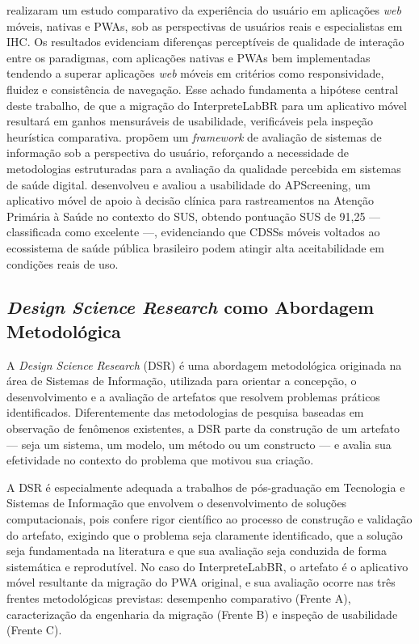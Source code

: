 \documentclass[12pt]{article}
\begin{document}
\cite{cardieri2018} realizaram um estudo comparativo da experiência do
usuário em aplicações \textit{web} móveis, nativas e PWAs, sob as
perspectivas de usuários reais e especialistas em IHC. Os resultados
evidenciam diferenças perceptíveis de qualidade de interação entre os
paradigmas, com aplicações nativas e PWAs bem implementadas tendendo a
superar aplicações \textit{web} móveis em critérios como responsividade,
fluidez e consistência de navegação. Esse achado fundamenta a hipótese
central deste trabalho, de que a migração do InterpreteLabBR para um
aplicativo móvel resultará em ganhos mensuráveis de usabilidade,
verificáveis pela inspeção heurística comparativa. \cite{rampinelli2026}
propõem um \textit{framework} de avaliação de sistemas de informação sob a
perspectiva do usuário, reforçando a necessidade de metodologias estruturadas
para a avaliação da qualidade percebida em sistemas de saúde digital.
\cite{vaz2026} desenvolveu e avaliou a usabilidade do APScreening, um
aplicativo móvel de apoio à decisão clínica para rastreamentos na Atenção
Primária à Saúde no contexto do SUS, obtendo pontuação SUS de 91,25 ---
classificada como excelente ---, evidenciando que CDSSs móveis voltados ao
ecossistema de saúde pública brasileiro podem atingir alta aceitabilidade em
condições reais de uso.

\subsection{\textit{Design Science Research} como Abordagem Metodológica}

A \textit{Design Science Research} (DSR) é uma abordagem metodológica
originada na área de Sistemas de Informação, utilizada para orientar a
concepção, o desenvolvimento e a avaliação de artefatos que resolvem
problemas práticos identificados. Diferentemente das metodologias de
pesquisa baseadas em observação de fenômenos existentes, a DSR parte da
construção de um artefato — seja um sistema, um modelo, um método ou um
constructo — e avalia sua efetividade no contexto do problema que motivou
sua criação.

A DSR é especialmente adequada a trabalhos de pós-graduação em Tecnologia e
Sistemas de Informação que envolvem o desenvolvimento de soluções
computacionais, pois confere rigor científico ao processo de construção e
validação do artefato, exigindo que o problema seja claramente identificado,
que a solução seja fundamentada na literatura e que sua avaliação seja
conduzida de forma sistemática e reprodutível. No caso do InterpreteLabBR,
o artefato é o aplicativo móvel resultante da migração do PWA original, e
sua avaliação ocorre nas três frentes metodológicas previstas: desempenho
comparativo (Frente A), caracterização da engenharia da migração (Frente B)
e inspeção de usabilidade (Frente C).
\end{document}
